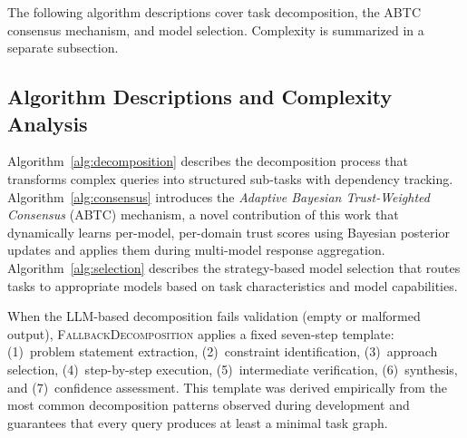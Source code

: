 \documentclass{iopjournal}
\newenvironment{algorithmic}[1][]{\begin{quote}\small}{\end{quote}}
\newcommand{\Require}{\textbf{Require:} }
\newcommand{\Ensure}{\textbf{Ensure:} }
\newcommand{\State}{\par\noindent}
\newcommand{\Comment}[1]{\hfill{\footnotesize(\textit{##1})}}
\newcommand{\For}[1]{\par\noindent\textbf{for} ##1 \textbf{do}}
\newcommand{\EndFor}{\par\noindent\textbf{end for}}
\newcommand{\If}[1]{\par\noindent\textbf{if} ##1 \textbf{then}}
\newcommand{\EndIf}{\par\noindent\textbf{end if}}
\newcommand{\Return}{\par\noindent\textbf{return} }
\begin{document}
The following algorithm descriptions cover task decomposition, the ABTC consensus mechanism, and model selection. Complexity is summarized in a separate subsection.

\subsection{Algorithm Descriptions and Complexity Analysis}

Algorithm~\ref{alg:decomposition} describes the decomposition process that transforms complex queries into structured sub-tasks with dependency tracking. Algorithm~\ref{alg:consensus} introduces the \emph{Adaptive Bayesian Trust-Weighted Consensus} (ABTC) mechanism, a novel contribution of this work that dynamically learns per-model, per-domain trust scores using Bayesian posterior updates and applies them during multi-model response aggregation. Algorithm~\ref{alg:selection} describes the strategy-based model selection that routes tasks to appropriate models based on task characteristics and model capabilities.


When the LLM-based decomposition fails validation (empty or malformed output), \textsc{FallbackDecomposition} applies a fixed seven-step template: (1)~problem statement extraction, (2)~constraint identification, (3)~approach selection, (4)~step-by-step execution, (5)~intermediate verification, (6)~synthesis, and (7)~confidence assessment. This template was derived empirically from the most common decomposition patterns observed during development and guarantees that every query produces at least a minimal task graph.
\end{document}
